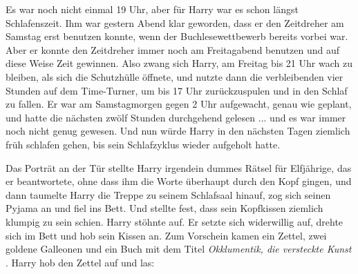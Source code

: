 Es war noch nicht einmal 19 Uhr, aber für Harry war es schon längst
Schlafenszeit. Ihm war gestern Abend klar geworden, dass er den Zeitdreher am
Samstag erst benutzen konnte, wenn der Buchlesewettbewerb bereits vorbei war.
Aber er konnte den Zeitdreher immer noch am Freitagabend benutzen und auf diese
Weise Zeit gewinnen. Also zwang sich Harry, am Freitag bis 21 Uhr wach zu
bleiben, als sich die Schutzhülle öffnete, und nutzte dann die verbleibenden
vier Stunden auf dem Time-Turner, um bis 17 Uhr zurückzuspulen und in den Schlaf
zu fallen. Er war am Samstagmorgen gegen 2 Uhr aufgewacht, genau wie geplant,
und hatte die nächsten zwölf Stunden durchgehend gelesen ... und es war immer
noch nicht genug gewesen. Und nun würde Harry in den nächsten Tagen ziemlich
früh schlafen gehen, bis sein Schlafzyklus wieder aufgeholt hatte.

Das Porträt an der Tür stellte Harry irgendein dummes Rätsel für Elfjährige, das
er beantwortete, ohne dass ihm die Worte überhaupt durch den Kopf gingen, und
dann taumelte Harry die Treppe zu seinem Schlafsaal hinauf, zog sich seinen
Pyjama an und fiel ins Bett. Und stellte fest, dass sein Kopfkissen ziemlich
klumpig zu sein schien. Harry stöhnte auf. Er setzte sich widerwillig auf,
drehte sich im Bett und hob sein Kissen an. Zum Vorschein kamen ein Zettel, zwei
goldene Galleonen und ein Buch mit dem Titel \emph{Okklumentik, die versteckte
Kunst} . Harry hob den Zettel auf und las:

